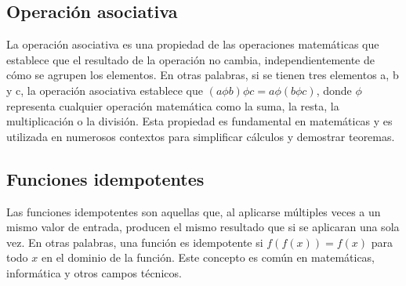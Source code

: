 \subsection{Operación asociativa}
La operación asociativa es una propiedad de las operaciones matemáticas que establece que el resultado de la operación no cambia, independientemente de cómo se agrupen los elementos. En otras palabras, si se tienen tres elementos a, b y c, la operación asociativa establece que $(a \phi b)\phi c = a \phi (b \phi c)$, donde $\phi$ representa cualquier operación matemática como la suma, la resta, la multiplicación o la división. Esta propiedad es fundamental en matemáticas y es utilizada en numerosos contextos para simplificar cálculos y demostrar teoremas.

\subsection{Funciones idempotentes}
Las funciones idempotentes son aquellas que, al aplicarse múltiples veces a un mismo valor de entrada, producen el mismo resultado que si se aplicaran una sola vez. En otras palabras, una función es idempotente si $f(f(x)) = f(x)$ para todo $x$ en el dominio de la función. Este concepto es común en matemáticas, informática y otros campos técnicos.
